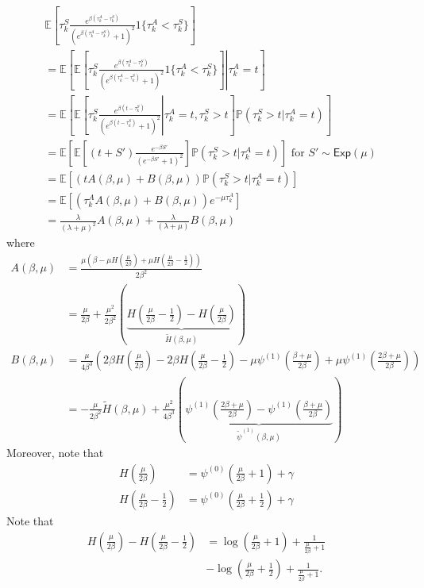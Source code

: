 \begin{align*}
 & \mathbb{E}\left[\tau_k^S\frac{e^{\beta(\tau_k^A-\tau_k^S)}}{(e^{\beta(\tau_k^A-\tau_k^S)}+1)^{2}}1\{\tau_k^A<\tau_k^S\}\right]\\
 & =\mathbb{E}\left[\left.\mathbb{E}\left[\tau_k^S\frac{e^{\beta(\tau_k^A-\tau_k^S)}}{(e^{\beta(\tau_k^A-\tau_k^S)}+1)^{2}}1\{\tau_k^A<\tau_k^S\}\right]\right |\tau_k^A=t\right]\\
 & =\mathbb{E}\left[\left.\mathbb{E}\left[\tau_k^S\frac{e^{\beta(t-\tau_k^S)}}{(e^{\beta(t-\tau_k^S)}+1)^{2}}\right|\tau_k^A=t,\tau_k^S>t\right]\mathbb{P}(\tau_k^S>t|\tau_k^A=t)\right]\\
 & =\mathbb{E}\left[\mathbb{E}\left[(t+S')\frac{e^{-\beta S'}}{(e^{-\beta S'}+1)^{2}}\right]\mathbb{P}(\tau_k^S>t|\tau_k^A=t)\right] \mbox{ for $S'\sim \mathsf{Exp}(\mu)$}\\
 & =\mathbb{E}\left[(tA(\beta,\mu)+B(\beta,\mu))\mathbb{P}(\tau_k^S>t|\tau_k^A=t)\right]\\
 & =\mathbb{E}\left[(\tau_k^A A(\beta,\mu)+B(\beta,\mu))e^{-\mu \tau_k^A}\right]\\
 & =\frac{\lambda}{(\lambda+\mu)^{2}}A(\beta,\mu)+\frac{\lambda}{(\lambda+\mu)}B(\beta,\mu)
\end{align*}
where
\begin{align*}
A(\beta,\mu) & =\frac{\mu\left(\beta-\mu H\left(\frac{\mu}{2\beta}\right)+\mu H\left(\frac{\mu}{2\beta}-\frac{1}{2}\right)\right)}{2\beta^{2}}\\
 & =\frac{\mu}{2\beta}+\frac{\mu^{2}}{2\beta^{2}}\left(\underbrace{H\left(\frac{\mu}{2\beta}-\frac{1}{2}\right)-H\left(\frac{\mu}{2\beta}\right)}_{\tilde{H}(\beta,\mu)}\right)\\
B(\beta,\mu) & =\frac{\mu}{4\beta^{3}}\left(2\beta H\left(\frac{\mu}{2\beta}\right)-2\beta H\left(\frac{\mu}{2\beta}-\frac{1}{2}\right)-\mu\psi^{(1)}\left(\frac{\beta+\mu}{2\beta}\right)+\mu\psi^{(1)}\left(\frac{2\beta+\mu}{2\beta}\right)\right)\\
 & =-\frac{\mu}{2\beta^{2}}\tilde{H}(\beta,\mu)+\frac{\mu^{2}}{4\beta^{3}}\left(\underbrace{\psi^{(1)}\left(\frac{2\beta+\mu}{2\beta}\right)-\psi^{(1)}\left(\frac{\beta+\mu}{2\beta}\right)}_{\tilde{\psi}^{(1)}(\beta,\mu)}\right)
\end{align*}
Moreover, note that
\begin{align*}
H\left(\frac{\mu}{2\beta}\right) & =\psi^{(0)}\left(\frac{\mu}{2\beta}+1\right)+\gamma\\
H\left(\frac{\mu}{2\beta}-\frac{1}{2}\right) & =\psi^{(0)}\left(\frac{\mu}{2\beta}+\frac{1}{2}\right)+\gamma
\end{align*}
Note that
\begin{align*}
H\left(\frac{\mu}{2\beta}\right)-H\left(\frac{\mu}{2\beta}-\frac{1}{2}\right) & =\log\left(\frac{\mu}{2\beta}+1\right)+\frac{1}{\frac{\mu}{2\beta}+1}\\
 & -\log\left(\frac{\mu}{2\beta}+\frac{1}{2}\right)+\frac{1}{\frac{\mu}{2\beta}+1}.
\end{align*}

